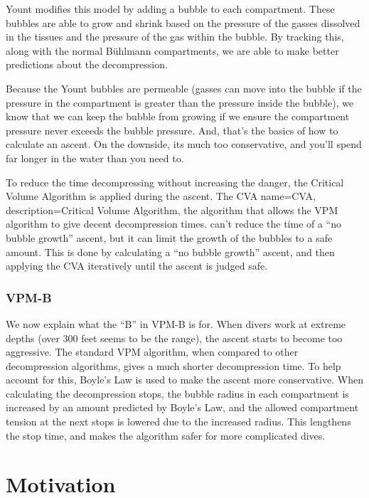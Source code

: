 \documentclass[12pt]{article}
\begin{document}
 Yount modifies this model by adding a bubble to each compartment. These bubbles are able to grow and
shrink based on the pressure of the gasses dissolved in the tissues and the pressure of the gas within the
bubble. By tracking this, along with the normal B\"uhlmann compartments, we are able to make better
predictions about the decompression.

Because the Yount bubbles are permeable (gasses can move into the bubble if the pressure in the compartment
is greater than the pressure inside the bubble), we know that we can keep the bubble from growing if we
ensure the compartment pressure never exceeds the bubble pressure. And, that's the basics of how to calculate
an ascent. On the downside, its much too conservative, and you'll spend far longer in the water than you need
to.

To reduce the time decompressing without increasing the danger, the Critical Volume Algorithm is applied
during the ascent. The CVA {name={CVA}, description={Critical Volume Algorithm, the algorithm that allows the VPM algorithm to give decent decompression times.}}
can't reduce the time of a ``no bubble growth'' ascent, but it can limit
the growth of the bubbles to a safe amount. This is done by calculating a ``no bubble growth'' ascent,
and then applying the CVA iteratively until the ascent is judged safe.

\subsubsection{VPM-B}

 We now explain what the ``B'' in VPM-B is for. When divers work at extreme
depths (over 300 feet seems to be the range), the ascent starts to become too aggressive. The standard VPM
algorithm, when compared to other decompression algorithms, gives a much shorter decompression time. To help account
for this, Boyle's Law is used to make the ascent more conservative. When calculating the
decompression stops, the bubble radius in each compartment is increased by an amount predicted by Boyle's Law,
and the allowed compartment tension at the next stops is lowered due to the increased radius. This
lengthens the stop time, and makes the algorithm safer for more complicated dives.

\section{Motivation}
\end{document}
